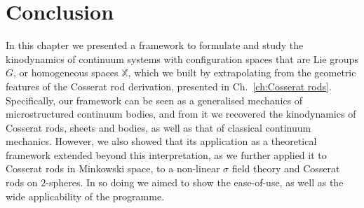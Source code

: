\section{Conclusion}

In this chapter we presented a framework to formulate and study the kinodynamics of continuum systems with configuration spaces that are Lie groups $G$, or homogeneous spaces $\mathbb{X}$, which we built by extrapolating from the geometric features of the Cosserat rod derivation, presented in Ch.~\ref{ch:Cosserat rods}. Specifically, our framework can be seen as a generalised mechanics of microstructured continuum bodies, and from it we recovered the kinodynamics of Cosserat rods, sheets and bodies, as well as that of classical continuum mechanics. However, we also showed that its application as a theoretical framework extended beyond this interpretation, as we further applied it to Cosserat rods in Minkowski space, to a non-linear $\sigma$ field theory and Cosserat rods on $2$-spheres. In so doing we aimed to show the ease-of-use, as well as the wide applicability of the programme.

